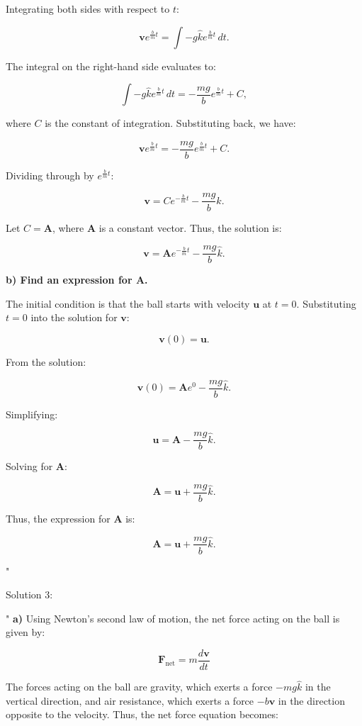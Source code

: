 Integrating both sides with respect to $t$:

\[
\mathbf{v} e^{\frac{b}{m}t} = \int -g\hat{k} e^{\frac{b}{m}t} \, dt.
\]

The integral on the right-hand side evaluates to:

\[
\int -g\hat{k} e^{\frac{b}{m}t} \, dt = -\frac{mg}{b} e^{\frac{b}{m}t} + C,
\]

where $C$ is the constant of integration. Substituting back, we have:

\[
\mathbf{v} e^{\frac{b}{m}t} = -\frac{mg}{b} e^{\frac{b}{m}t} + C.
\]

Dividing through by $e^{\frac{b}{m}t}$:

\[
\mathbf{v} = C e^{-\frac{b}{m}t} - \frac{mg}{b} \hat{k}.
\]

Let $C = \mathbf{A}$, where $\mathbf{A}$ is a constant vector. Thus, the solution is:

\[
\mathbf{v} = \mathbf{A} e^{-\frac{b}{m}t} - \frac{mg}{b} \hat{k}.
\]

\textbf{b) Find an expression for $\mathbf{A}$.}

The initial condition is that the ball starts with velocity $\mathbf{u}$ at $t = 0$. Substituting $t = 0$ into the solution for $\mathbf{v}$:

\[
\mathbf{v}(0) = \mathbf{u}.
\]

From the solution:

\[
\mathbf{v}(0) = \mathbf{A} e^{0} - \frac{mg}{b} \hat{k}.
\]

Simplifying:

\[
\mathbf{u} = \mathbf{A} - \frac{mg}{b} \hat{k}.
\]

Solving for $\mathbf{A}$:

\[
\mathbf{A} = \mathbf{u} + \frac{mg}{b} \hat{k}.
\]

Thus, the expression for $\mathbf{A}$ is:

\[
\mathbf{A} = \mathbf{u} + \frac{mg}{b} \hat{k}.
\]

"

Solution 3:

"
\textbf{a)} Using Newton's second law of motion, the net force acting on the ball is given by:

\[
\mathbf{F}_{\text{net}} = m \frac{d\mathbf{v}}{dt}
\]

The forces acting on the ball are gravity, which exerts a force $-mg\hat{k}$ in the vertical direction, and air resistance, which exerts a force $-b\mathbf{v}$ in the direction opposite to the velocity. Thus, the net force equation becomes:

